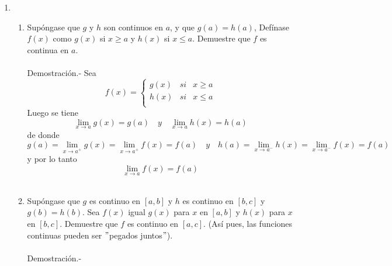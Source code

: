 \begin{enumerate}
\item
\begin{enumerate}[\bfseries (a)]

    \item Supóngase que $g$ y $h$ son continuos en $a$, y que $g(a)=h(a)$, Defínase $f(x)$  como $g(x)$ si $x\geq a$ y $h(x)$ si $x\leq a$. Demuestre que $f$ es continua en $a$.\\\\
	Demostración.-\; Sea 
	$$f(x) = \left\{\begin{array}{rcl}
	    g(x)&si&x\geq a\\
	    h(x)&si&x\leq a\\
	\end{array}\right.$$
	Luego se tiene $$\lim\limits_{x\to a} g(x) = g(a)\quad  y \quad \lim\limits_{x\to a} h(x) = h(a)$$ de donde $$g(a) = \lim\limits_{x\to a^+} g(x) = \lim\limits_{x\to a^+} f(x) = f(a) \quad y \quad h(a) = \lim\limits_{x\to a^-} h(x) = \lim\limits_{x\to a^-} f(x) = f(a)$$
	y por lo tanto $$\lim\limits_{x\to a} f(x) = f(a)$$\\

    \item Supóngase que $g$ es continuo en $[a,b]$ y $h$ es continuo en $[b,c]$ y $g(b)=h(b)$. Sea $f(x)$ igual $g(x)$ para $x$ en $[a,b]$ y $h(x)$ para $x$ en $[b,c]$. Demuestre que $f$ es continuo en $[a,c]$. (Así pues, las funciones continuas pueden ser $"$pegados juntos$"$).\\\\
	Demostración.-\; 

\end{enumerate}



\end{enumerate}

